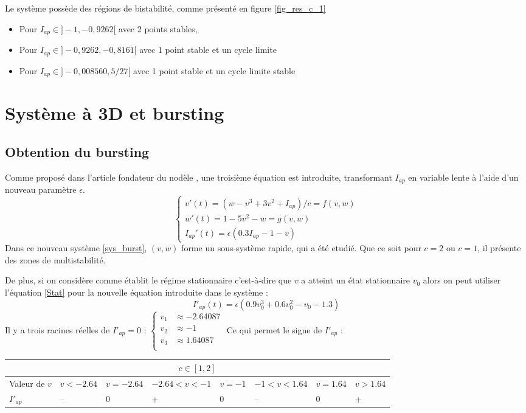\documentclass[12pt,a4paper,onecolumn]{article}
\begin{document}
Le système possède des régions de bistabilité, comme présenté en figure \ref{fig_res_c_1}
\begin{itemize}
\item Pour $I_{ap} \in ]-1, -0,9262[$ avec 2 points stables,
\item Pour $I_{ap} \in ]-0,9262, -0,8161[$ avec 1 point stable et un cycle limite
\item Pour  $I_{ap} \in ] -0,008560, 5/27[$ avec 1 point stable et un cycle limite stable
\end{itemize}

\section{Système à 3D et bursting}
\subsection{Obtention du bursting}
Comme proposé dans l'article fondateur du nodèle \cite{hindmarsh1984model}, une troisième équation est introduite, transformant $I_{ap}$ en variable lente à l'aide d'un nouveau paramètre $\epsilon$.
\begin{equation}
\left\{
\begin{array}{l }
v'(t)= (w - v^3 + 3v^2 +I_{ap})/c = f(v,w) \\
w'(t) = 1 - 5 v^2 - w = g(v,w)  \\
I_{ap}'(t)= \epsilon (0.3 I_{ap} -1 -v)
\end{array}
\right.
\label{sys_burst}
\end{equation}
Dans ce nouveau système \ref{sys_burst}, $(v, w)$ forme un sous-système rapide, qui a été etudié. Que ce soit pour $c=2$ ou $c=1$, il présente des zones de multistabilité.

De plus, si on considère comme établit le régime stationnaire c'est-à-dire que $v$ a atteint un état stationnaire $v_0$ alors on peut utiliser l'équation \ref{Stat} pour la nouvelle équation introduite dans le système :
$$
I'_{ap}(t) = \epsilon(0.9v_0^3+0.6v_0^2-v_0-1.3)
$$
Il y a trois racines réelles de $I'_{ap} = 0$ :
$\left\{
\begin{array}{rl}
v_1 &\approx -2.64087\\
v_2 &\approx -1\\
v_3 &\approx 1.64087\\
\end{array}
\right.$
Ce qui permet le signe de $I'_{ap}$ :
\begin{center}
	\begin{tabular}{|L{2.2cm} | C{1.5cm} | C{1.5cm} | C{1.5cm} |C{1.5cm}|C{1.5cm}|C{1.5cm}|C{1.5cm}|}
	\hline
	\\\hline
	Valeur de $v$ & $v < -2.64$ & $v = -2.64$ & $ -2.64 < v < -1$ & $v = -1$ & $-1 < v < 1.64$ & $v=1.64$ & $v > 1.64$ \\
	 \hline
	$I'_{ap}$ & -- & 0 & + & 0 & -- & 0 & +\\ \hline
	\end{tabular}
\end{center}
\end{document}
